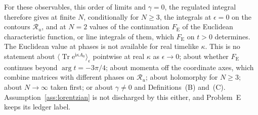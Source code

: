 For these observables, this order of limits and \(\gamma=0\), the regulated integral therefore gives at finite \(N\), conditionally for \(N\ge3\), the integrals at \(\epsilon=0\) on the contours \(\mathcal R_u\), and at \(N=2\) values of the continuation \(F_{\mathrm E}\) of the Euclidean characteristic function, or line integrals of them, which \(F_{\mathrm E}\) on \(t>0\) determines. The Euclidean value at phases is not available for real timelike \(\kappa\). This is no statement about \(\langle\operatorname{Tr}\mathrm e^{\mathrm i\kappa A_0}\rangle_\epsilon\) pointwise at real \(\kappa\) as \(\epsilon\to0\); about whether \(F_{\mathrm E}\) continues beyond \(\arg t=-3\pi/4\); about momenta off the coordinate axes, which combine matrices with different phases on \(\mathcal R_u\); about holomorphy for \(N\ge3\); about \(N\to\infty\) taken first; or about \(\gamma\neq0\) and Definitions~(B) and~(C). Assumption~\ref{ass:lorentzian} is not discharged by this either, and Problem~E keeps its ledger label.
